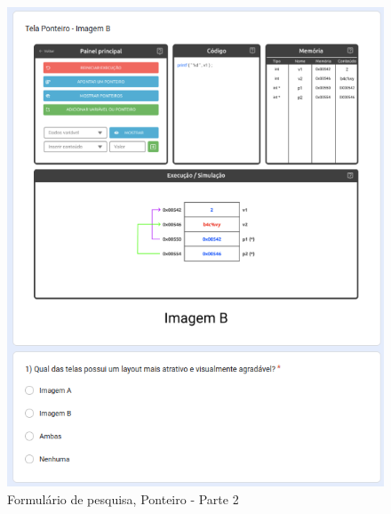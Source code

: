 \begin{figure}[!h]
	\begin{center}
	    \includegraphics[scale=0.6]{figs/Form/20.png}
	\end{center}
	\caption{\label{AP_PonP02}Formulário de pesquisa, Ponteiro - Parte 2}
\end{figure}

\newpage


